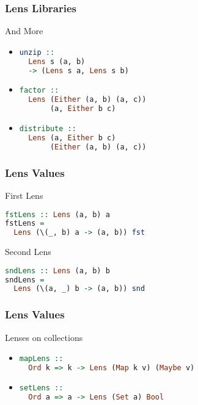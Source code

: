 \begin{frame}[fragile]
\frametitle{Lens Libraries}

\begin{block}{And More}
\begin{itemize}
\item \begin{lstlisting}[language=haskell]
unzip ::
  Lens s (a, b)
  -> (Lens s a, Lens s b)
\end{lstlisting}

\item \begin{lstlisting}[language=haskell]
factor ::
  Lens (Either (a, b) (a, c)) 
       (a, Either b c)
\end{lstlisting}

\item \begin{lstlisting}[language=haskell]
distribute ::
  Lens (a, Either b c)
       (Either (a, b) (a, c))
\end{lstlisting}
\end{itemize}
\end{block}

\end{frame}

\begin{frame}[fragile]
\frametitle{Lens Values}

\begin{block}{First Lens}
\begin{lstlisting}[language=haskell]
fstLens :: Lens (a, b) a
fstLens =
  Lens (\(_, b) a -> (a, b)) fst
\end{lstlisting}
\end{block}
\begin{block}{Second Lens}
\begin{lstlisting}[language=haskell]
sndLens :: Lens (a, b) b
sndLens =
  Lens (\(a, _) b -> (a, b)) snd
\end{lstlisting}
\end{block}

\end{frame}

\begin{frame}[fragile]
\frametitle{Lens Values}

\begin{block}{Lenses on collections}
\begin{itemize}
\item \begin{lstlisting}[language=haskell]
mapLens ::
  Ord k => k -> Lens (Map k v) (Maybe v)
\end{lstlisting}

\item \begin{lstlisting}[language=haskell]
setLens ::
  Ord a => a -> Lens (Set a) Bool
\end{lstlisting}
\end{itemize}
\end{block}

\end{frame}

